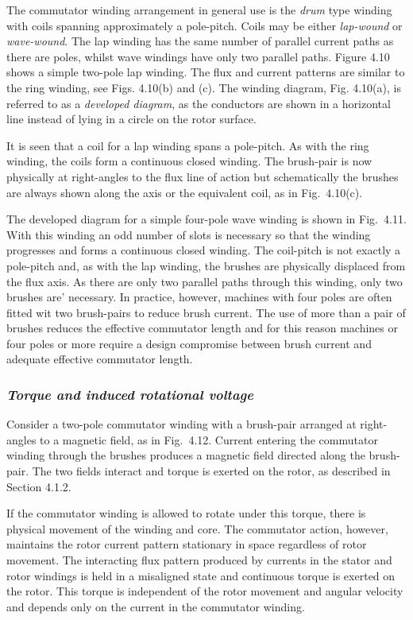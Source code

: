\documentclass[a4paper,numbers=noenddot,12pt]{scrbook}
\begin{document}
            The commutator winding arrangement in general use is the \textit{drum} type winding with coils spanning approximately a pole-pitch. Coils may be either \textit{lap-wound} or \textit{wave-wound}. The lap winding has the same number of parallel current paths as there are poles, whilst wave windings have only two parallel paths. Figure 4.10 shows a simple two-pole lap winding. The flux and current patterns are similar to the ring winding, see Figs. 4.10(b) and (c). The winding diagram, Fig.
            4.10(a), is referred to as a \textit{developed diagram}, as the conductors are shown in a horizontal line instead of lying in a circle on the rotor surface.

            It is seen that a coil for a lap winding spans a pole-pitch. As with the ring winding, the coils form a continuous closed winding. The brush-pair is now physically at right-angles to the flux line of action but schematically the brushes are always shown along the axis or the equivalent coil, as in Fig.\ 4.10(c). 

            The developed diagram for a simple four-pole wave winding is shown in Fig.\ 4.11. With this winding an odd number of slots is necessary so that the winding progresses and forms a continuous closed winding. The coil-pitch is not exactly a pole-pitch and, as with the lap winding, the brushes are physically displaced from the flux axis. As there are only two parallel paths through this winding, only two brushes are' necessary. In practice, however, machines with four poles are often fitted wit two
            brush-pairs to reduce brush current. The use of more than a pair of brushes reduces the effective commutator length and for this reason machines or four poles or more require a design compromise between brush current and adequate effective commutator length. 

            \subsubsection{\textit{Torque and induced rotational voltage}}
            Consider a two-pole commutator winding with a brush-pair arranged at right-angles to a magnetic field, as in Fig.\ 4.12. Current entering the commutator winding through the brushes produces a magnetic field directed along the brush-pair. The two fields interact and torque is exerted on the rotor, as described in Section 4.1.2. 

            If the commutator winding is allowed to rotate under this torque, there is physical movement of the winding and core. The commutator action, however, maintains the rotor current pattern stationary in space regardless of rotor movement. The interacting flux pattern produced by currents in the stator and rotor windings is held in a misaligned state and continuous torque is exerted on the rotor. This torque is independent of the rotor movement and angular velocity and depends only on the current in the commutator winding.
\end{document}

